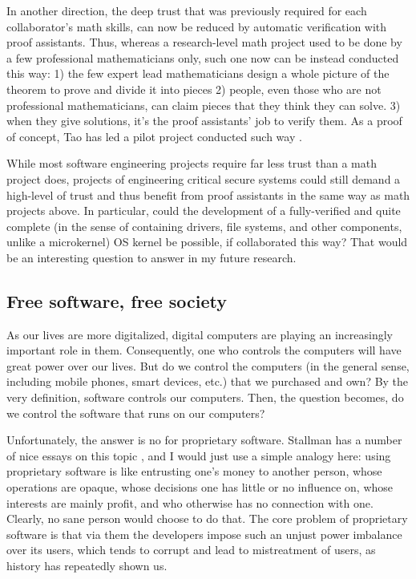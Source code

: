 \documentclass[10pt]{article}
\begin{document}
In another direction, the deep trust that was previously required for each
collaborator's math skills, can now be reduced by automatic verification with
proof assistants. Thus, whereas a research-level math project used to be done
by a few professional mathematicians only, such one now can be instead
conducted this way: 1) the few expert lead mathematicians design a whole picture
of the theorem to prove and divide it into pieces 2) people, even those who are
not professional mathematicians, can claim pieces that they think they can
solve. 3) when they give solutions, it's the proof assistants' job to verify
them. As a proof of concept, Tao has led a pilot project conducted such way
\cite{tao.pilot.project}.

While most software engineering projects require far less trust than a
math project does, projects of engineering critical secure systems could
still demand a high-level of trust and thus benefit from proof assistants in
the same way as math projects above. In particular, could the development of a
fully-verified and quite complete (in the sense of containing drivers, file
systems, and other components, unlike a microkernel) OS kernel be possible, if
collaborated this way? That would be an interesting question to answer in my
future research.

\subsection[Free software, free society]{
Free software, free society\protect\footnotemark}
\label{sec.free.software}

As our lives are more digitalized, digital computers are playing an
increasingly important role in them. Consequently, one who controls the
computers will have great power over our lives. But do we control the computers
(in the general sense, including mobile phones, smart devices, etc.) that we
purchased and own? By the very definition, software controls our computers.
Then, the question becomes, do we control the software that runs on our
computers?

Unfortunately, the answer is no for proprietary software. Stallman
has a number of nice essays on this topic \cite{stallman.essays}, and I would
just use a simple analogy here: using proprietary software is like entrusting
one's money to another person, whose operations are opaque, whose decisions one
has little or no influence on, whose interests are mainly profit, and who
otherwise has no connection with one. Clearly, no sane person would choose to
do that.  The core problem of proprietary software is that via them the
developers impose such an unjust power imbalance over its users, which tends to
corrupt and lead to mistreatment of users, as history has repeatedly shown us.
\end{document}

